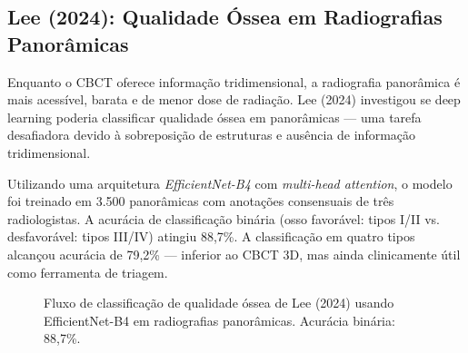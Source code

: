 
\subsection{Lee (2024): Qualidade Óssea em Radiografias Panorâmicas}

Enquanto o CBCT oferece informação tridimensional, a radiografia panorâmica é mais acessível, barata e de menor dose de radiação. Lee (2024) investigou se deep learning poderia classificar qualidade óssea em panorâmicas --- uma tarefa desafiadora devido à sobreposição de estruturas e ausência de informação tridimensional.

Utilizando uma arquitetura \textit{EfficientNet-B4} com \textit{multi-head attention}, o modelo foi treinado em 3.500 panorâmicas com anotações consensuais de três radiologistas. A acurácia de classificação binária (osso favorável: tipos I/II vs. desfavorável: tipos III/IV) atingiu 88,7\%. A classificação em quatro tipos alcançou acurácia de 79,2\% --- inferior ao CBCT 3D, mas ainda clinicamente útil como ferramenta de triagem.

\begin{figure}[H]
\centering
{}
\caption{Fluxo de classificação de qualidade óssea de Lee (2024) usando EfficientNet-B4 em radiografias panorâmicas. Acurácia binária: 88,7\%.}
\label{fig:fluxo-classificacao-ossea}
\end{figure}

